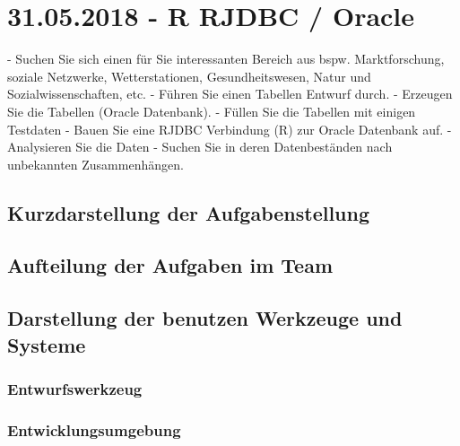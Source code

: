 \documentclass[12pt,ngerman,twoside]{scrartcl}
\begin{document}
\newpage




\newpage


\section{31.05.2018 - R RJDBC / Oracle}
- Suchen Sie sich einen für Sie interessanten Bereich aus bspw. Marktforschung, soziale Netzwerke, Wetterstationen, Gesundheitswesen, Natur und Sozialwissenschaften, etc. 
- Führen Sie einen Tabellen Entwurf durch. 
- Erzeugen Sie die Tabellen (Oracle Datenbank).
- Füllen Sie die Tabellen mit einigen Testdaten 
- Bauen Sie eine RJDBC Verbindung (R) zur Oracle Datenbank auf.
- Analysieren Sie die Daten 
- Suchen Sie in deren Datenbeständen nach unbekannten Zusammenhängen. 

\subsection{Kurzdarstellung der Aufgabenstellung}
\subsection{Aufteilung der Aufgaben im Team}
\subsection{Darstellung der benutzen Werkzeuge und Systeme}
\subsubsection*{Entwurfswerkzeug}
\subsubsection*{Entwicklungsumgebung}


\newpage




\newpage



\end{document}
